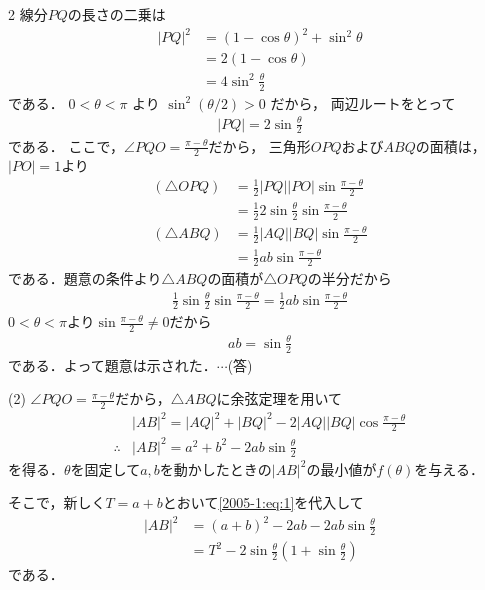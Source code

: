 \documentclass[../../../../main.tex]{subfiles}
\begin{document}
\begin{multicols}{2}
    線分$PQ$の長さの二乗は
    \begin{align*}
        |PQ|^2
         & = (1-\cos\theta)^2 + \sin^2\theta \\
         & = 2(1-\cos\theta)                 \\
         & = 4\sin^2\frac{\theta}{2}
    \end{align*}
    である．
    $0 < \theta < \pi$ より $\sin^2(\theta/2) > 0$ だから，
    両辺ルートをとって
    \begin{align*}
        |PQ| = 2\sin\frac{\theta}{2}
    \end{align*}
    である．
    ここで，$\angle PQO = \frac{\pi-\theta}{2}$だから，
    三角形$OPQ$および$ABQ$の面積は，$|PO|=1$より
    \begin{align*}
        (\triangle OPQ)
         & = \frac{1}{2}|PQ||PO|\sin\frac{\pi-\theta}{2}                \\
         & = \frac{1}{2} 2\sin\frac{\theta}{2} \sin\frac{\pi-\theta}{2} \\
        (\triangle ABQ)
         & = \frac{1}{2}|AQ||BQ|\sin\frac{\pi-\theta}{2}                \\
         & = \frac{1}{2} ab \sin\frac{\pi-\theta}{2}
    \end{align*}
    である．題意の条件より$\triangle ABQ$の面積が$\triangle OPQ$の半分だから
    \begin{align*}
        \frac{1}{2} \sin\frac{\theta}{2} \sin\frac{\pi-\theta}{2} =  \frac{1}{2} ab \sin\frac{\pi-\theta}{2}
    \end{align*}
    $0<\theta<\pi$より$\sin\frac{\pi-\theta}{2}\neq 0$だから
    \begin{align}
        ab = \sin\frac{\theta}{2} \label{2005-1:eq:1}
    \end{align}
    である．よって題意は示された．$\cdots$(答)

    \vspace{10pt}
    (2)
    $\angle PQO=\frac{\pi-\theta}{2}$だから，$\triangle ABQ$に余弦定理を用いて
    \begin{align*}
         & |AB|^2 = |AQ|^2 + |BQ|^2 -2 |AQ||BQ|\cos \frac{\pi-\theta}{2} \\
        \therefore
         & |AB|^2 = a^2 + b^2 -2ab\sin\frac{\theta}{2}
    \end{align*}
    を得る．$\theta$を固定して$a,b$を動かしたときの$|AB|^2$の最小値が$f(\theta)$を与える．

    そこで，新しく$T=a+b$とおいて\cref{2005-1:eq:1}を代入して
    \begin{align}
        |AB|^2
         & = (a+b)^2 - 2ab -2ab\sin\frac{\theta}{2}                                            \\
         & = T^2 -2\sin\frac{\theta}{2}\left(1+\sin\frac{\theta}{2}\right) \label{2005-1:eq:2}
    \end{align}
    である．


\end{multicols}
\end{document}

